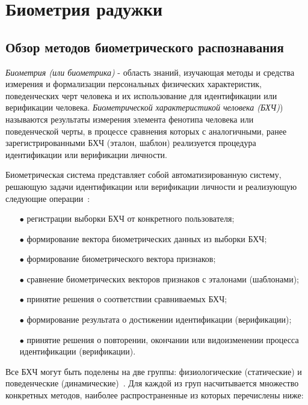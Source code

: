 \chapter{Биометрия радужки}

\section{Обзор методов биометрического распознавания}
\label{sec:beometric_methods_overview}

\textit{Биометрия (или биометрика)} - область знаний, изучающая методы и средства измерения и формализации персональных физических характеристик, поведенческих черт человека и их использование для идентификации или верификации человека.
\textit{Биометрической характеристикой человека (БХЧ)}) называются результаты измерения элемента фенотипа человека или поведенческой черты, в процессе сравнения которых с аналогичными, ранее зарегистрированными БХЧ (эталон, шаблон) реализуется процедура идентификации или верификации личности.

Биометрическая система представляет собой автоматизированную систему, решающую задачи идентификации или верификации личности и реализующую следующие операции~\cite{bmstu_biometrics}:

\begin{itemize}
	\setlength\itemsep{0.01em}
	\item[$\bullet$] регистрации выборки БХЧ от конкретного пользователя;
	\item[$\bullet$] формирование вектора биометрических данных из выборки БХЧ;
	\item[$\bullet$] формирование биометрического вектора признаков;
	\item[$\bullet$] сравнение биометрических векторов признаков с эталонами (шаблонами);
	\item[$\bullet$] принятие решения о соответствии сравниваемых БХЧ;
	\item[$\bullet$] формирование результата о достижении идентификации (верификации);
	\item[$\bullet$] принятие решения о повторении, окончании или видоизменении процесса идентификации (верификации).
\end{itemize}

Все БХЧ могут быть поделены на две группы: физиологические (статические) и поведенческие (динамические)~\cite{bmstu_biometrics}. Для каждой из груп насчитывается множество конкретных методов, наиболее распространенные из которых перечислены ниже:

